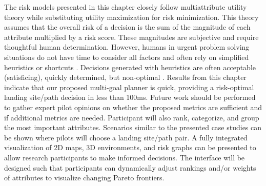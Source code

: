The risk models presented in this chapter closely follow multiattribute utility theory while substituting utility maximization for risk minimization\cite{Wickens2015}. This theory assumes that the overall risk of a decision is the sum of the magnitude of each attribute multiplied by a risk score. These magnitudes are subjective and require thoughtful human determination. However, humans in urgent problem solving situations do not have time to consider all factors and often rely on simplified heuristics or shortcuts \cite{2003_technical_review_human_error}. Decisions generated with heuristics are often acceptable (satisficing), quickly determined, but non-optimal \cite{wickens_5_1988}. Results from this chapter indicate that our proposed multi-goal planner is quick, providing a risk-optimal landing site/path decision in less than 100ms. Future work should be performed to gather expert pilot opinions on whether the proposed metrics are sufficient and if additional metrics are needed. Participant will also rank, categorize, and group the most important attributes. Scenarios similar to the presented case studies can be shown where pilots will choose a landing site/path pair. A fully integrated visualization of 2D maps, 3D environments, and risk graphs can be presented to allow research participants to make informed decisions. The interface will be designed such that participants can dynamically adjust rankings and/or weights of attributes to visualize changing Pareto frontiers.








